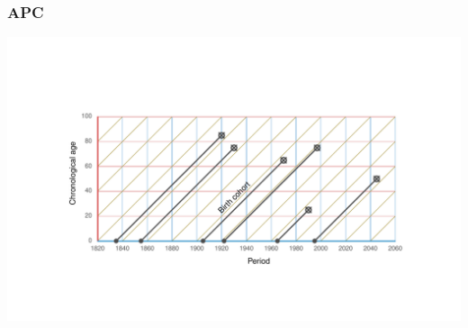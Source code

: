 \documentclass[20pt]{beamer}
\begin{document}

\begin{frame}
\frametitle{APC}
\begin{center}
\includegraphics[trim= 200 200 200 200, scale=1.5]{Figures/APCrt.pdf}
\end{center}
\end{frame}


\end{document}
